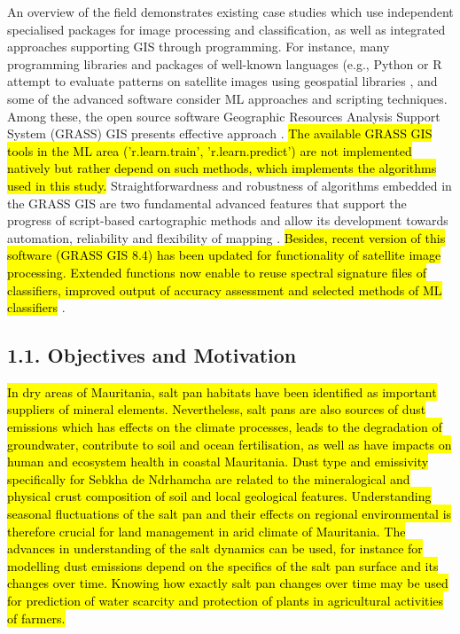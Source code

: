 \documentclass[12pt,a4paper,oneside]{article}
\def \newpar{\vspace{6pt}}
\begin{document}
\newpar An overview of the field demonstrates existing case studies which use independent specialised packages for image processing and classification, as well as integrated approaches supporting GIS through programming. For instance, many programming libraries and packages of well-known languages (e.g., Python or R \citep{Lemenkova202324} attempt to evaluate patterns on satellite images using geospatial libraries \citep{Lemenkova202229,Lemenkova202227}, and some of the advanced software consider ML approaches and scripting techniques. Among these, the open source software Geographic Resources Analysis Support System (GRASS) GIS presents effective approach \citep{NETELER2012124,MitasovaNeteler}. \hl{The available GRASS GIS  tools in the ML area ('r.learn.train', 'r.learn.predict') are not implemented natively but rather depend on such methods, which implements the algorithms used in this study. }Straightforwardness and robustness of algorithms embedded in the GRASS GIS are two fundamental advanced features that support the progress of script-based cartographic methods and allow its development towards automation, reliability and flexibility of mapping \citep{ROCCHINI201382,Lemenkova202307,ROCCHINI2017166}. \hl{Besides, recent version of this software (GRASS GIS 8.4) has been updated for functionality of satellite image processing. Extended functions now enable to reuse spectral signature files of classifiers, improved output of accuracy assessment and selected methods of ML classifiers} \citep{Nartiss}. 

\subsection*{1.1. Objectives and Motivation}

\newpar \hl{In dry areas of Mauritania, salt pan habitats have been identified as important suppliers of mineral elements. Nevertheless, salt pans are also sources of dust emissions which has effects on the climate processes, leads to the degradation of groundwater, contribute to soil and ocean fertilisation, as well as have impacts on human and ecosystem health in coastal Mauritania. Dust type and emissivity specifically for Sebkha de Ndrhamcha are related to the mineralogical and physical crust composition of soil and local geological features. Understanding seasonal fluctuations of the salt pan and their effects on regional environmental is therefore crucial for land management in arid climate of Mauritania. The advances in understanding of the salt dynamics can be used, for instance for modelling dust emissions depend on the specifics of the salt pan surface and its changes over time. Knowing how exactly salt pan changes over time may be used for prediction of water scarcity and protection of plants in agricultural activities of farmers. }
\end{document}
